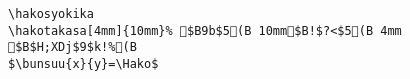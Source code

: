 \begin{verbatim}
\hakosyokika
\hakotakasa[4mm]{10mm}%	$B9b$5(B 10mm$B!$?<$5(B 4mm $B$H;XDj$9$k!%(B
$\bunsuu{x}{y}=\Hako$
\end{verbatim}
